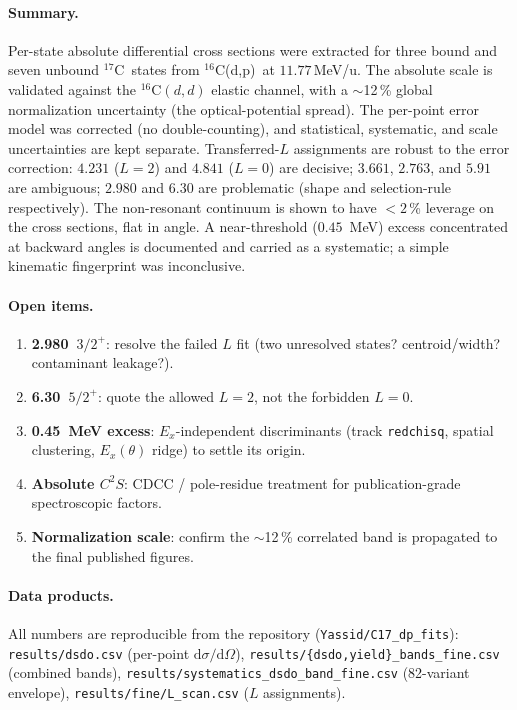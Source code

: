 \documentclass[11pt,a4paper]{article}
\newcommand{\Cs}{$^{16}$C}
\newcommand{\Cse}{$^{17}$C}
\newcommand{\dpr}{(d,p)}
\newcommand{\dsdo}{$\mathrm{d}\sigma/\mathrm{d}\Omega$}
\newcommand{\mevu}{\,MeV/u}
\begin{document}
\paragraph{Summary.}
Per-state absolute differential cross sections were extracted for three bound
and seven unbound \Cse\ states from \Cs\dpr\ at $11.77$\mevu. The absolute scale
is validated against the \Cs$(d,d)$ elastic channel, with a $\sim$12\,\% global
normalization uncertainty (the optical-potential spread). The per-point error
model was corrected (no double-counting), and statistical, systematic, and scale
uncertainties are kept separate. Transferred-$L$ assignments are robust to the
error correction: $4.231$ ($L{=}2$) and $4.841$ ($L{=}0$) are decisive; $3.661$,
$2.763$, and $5.91$ are ambiguous; $2.980$ and $6.30$ are problematic (shape and
selection-rule respectively). The non-resonant continuum is shown to have
$<2$\,\% leverage on the cross sections, flat in angle. A near-threshold
($0.45$~MeV) excess concentrated at backward angles is documented and carried as
a systematic; a simple kinematic fingerprint was inconclusive.

\paragraph{Open items.}
\begin{enumerate}
  \item \textbf{2.980~$3/2^+$}: resolve the failed $L$ fit (two unresolved
    states? centroid/width? contaminant leakage?).
  \item \textbf{6.30~$5/2^+$}: quote the allowed $L{=}2$, not the forbidden
    $L{=}0$.
  \item \textbf{0.45~MeV excess}: $E_x$-independent discriminants (track
    \texttt{redchisq}, spatial clustering, $E_x(\theta)$ ridge) to settle its
    origin.
  \item \textbf{Absolute $C^2S$}: CDCC / pole-residue treatment for
    publication-grade spectroscopic factors.
  \item \textbf{Normalization scale}: confirm the $\sim$12\,\% correlated band
    is propagated to the final published figures.
\end{enumerate}

\paragraph{Data products.}
All numbers are reproducible from the repository
(\texttt{Yassid/C17\_dp\_fits}): \texttt{results/dsdo.csv} (per-point \dsdo),
\texttt{results/\{dsdo,yield\}\_bands\_fine.csv} (combined bands),
\texttt{results/systematics\_dsdo\_band\_fine.csv} (82-variant envelope),
\texttt{results/fine/L\_scan.csv} ($L$ assignments).



\end{document}
